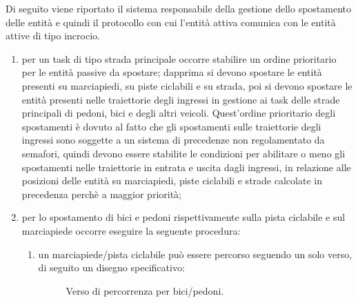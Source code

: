 Di seguito viene riportato il sistema responsabile della gestione dello spostamento delle entità e quindi il protocollo con cui l'entità attiva comunica con le entità attive di tipo incrocio. 
\begin{enumerate}
\item per un task di tipo strada principale occorre stabilire un ordine prioritario per le entità passive da spostare; dapprima si devono spostare le entità presenti su marciapiedi, su piste ciclabili e su strada, poi si devono spostare le entità presenti nelle traiettorie degli ingressi in gestione ai task delle strade principali di pedoni, bici e degli altri veicoli. 
Quest'ordine prioritario degli spostamenti è dovuto al fatto che gli spostamenti sulle traiettorie degli ingressi sono soggette a un sistema di precedenze non regolamentato da semafori, quindi devono essere stabilite le condizioni per abilitare o meno gli spostamenti nelle traiettorie in entrata e uscita dagli ingressi, in relazione alle posizioni delle entità su marciapiedi, piste ciclabili e strade calcolate in precedenza perchè a maggior priorità;
\item per lo spostamento di bici e pedoni rispettivamente sulla pista ciclabile e sul marciapiede occorre eseguire la seguente procedura:
\begin{enumerate}
\item un marciapiede/pista ciclabile può essere percorso seguendo un solo verso, di seguito un disegno specificativo:

\begin{figure}[H] %
\caption{Verso di percorrenza per bici/pedoni.}
\label{fig:Verso di percorrenza per bici/pedoni}
\end{figure}




\end{enumerate}
\end{enumerate}
